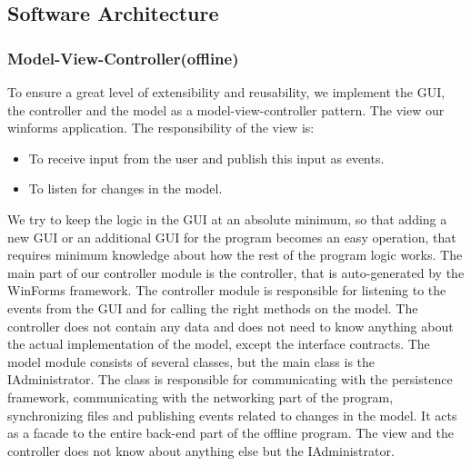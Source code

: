 \subsection{Software Architecture}
\subsubsection{Model-View-Controller(offline)}
To ensure a great level of extensibility and reusability, we implement the GUI, the controller and the model as a model-view-controller pattern. The view our winforms application. The responsibility of the view is:
\begin{itemize}
\item  To receive input from the user and publish this input as events. 
\item To listen for changes in the model. 
\end{itemize}
We try to keep the logic in the GUI at an absolute minimum, so that adding a new GUI or an additional GUI for the program becomes an easy operation, that requires minimum knowledge about how the rest of the program logic  works. The main part of our controller module is the controller, that is auto-generated by the WinForms framework. The controller module is responsible for listening to the events from the GUI and for calling the right methods on the model. The controller does not contain any data and does not need to know anything about the actual implementation of the model, except the interface contracts. The model module consists of several classes, but the main class is the IAdministrator. The class is responsible for communicating with the persistence framework, communicating with the networking part of the program, synchronizing files and publishing events related to changes in the model. It acts as a facade to the entire back-end part of the offline program. The view and the controller does not know about anything else but the IAdministrator.
\newline
